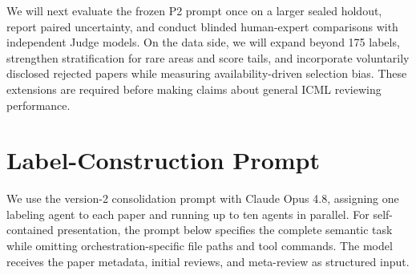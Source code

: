\documentclass{article}
\begin{document}
We will next evaluate the frozen P2 prompt once on a larger sealed holdout, report paired uncertainty, and conduct blinded human-expert comparisons with independent Judge models. On the data side, we will expand beyond 175 labels, strengthen stratification for rare areas and score tails, and incorporate voluntarily disclosed rejected papers while measuring availability-driven selection bias. These extensions are required before making claims about general ICML reviewing performance.




\newpage
\appendix
\onecolumn

\section{Label-Construction Prompt}
We use the version-2 consolidation prompt with Claude Opus 4.8, assigning one labeling agent to each paper and running up to ten agents in parallel. For self-contained presentation, the prompt below specifies the complete semantic task while omitting orchestration-specific file paths and tool commands. The model receives the paper metadata, initial reviews, and meta-review as structured input.
\end{document}
